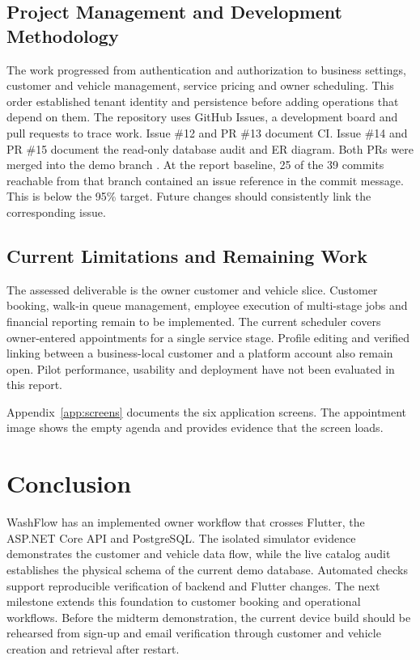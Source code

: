 \documentclass[12pt]{report}
\begin{document}
\section{Project Management and Development Methodology}
The work progressed from authentication and authorization to business settings, customer and vehicle management, service pricing and owner scheduling. This order established tenant identity and persistence before adding operations that depend on them. The repository uses GitHub Issues, a development board and pull requests to trace work. Issue \#12 and PR \#13 document CI. Issue \#14 and PR \#15 document the read-only database audit and ER diagram. Both PRs were merged into the demo branch \cite{ciPR,erdPR}. At the report baseline, 25 of the 39 commits reachable from that branch contained an issue reference in the commit message. This is below the 95\% target. Future changes should consistently link the corresponding issue.

\section{Current Limitations and Remaining Work}
The assessed deliverable is the owner customer and vehicle slice. Customer booking, walk-in queue management, employee execution of multi-stage jobs and financial reporting remain to be implemented. The current scheduler covers owner-entered appointments for a single service stage. Profile editing and verified linking between a business-local customer and a platform account also remain open. Pilot performance, usability and deployment have not been evaluated in this report.

Appendix~\ref{app:screens} documents the six application screens. The appointment image shows the empty agenda and provides evidence that the screen loads.

\chapter{Conclusion}
WashFlow has an implemented owner workflow that crosses Flutter, the ASP.NET Core API and PostgreSQL. The isolated simulator evidence demonstrates the customer and vehicle data flow, while the live catalog audit establishes the physical schema of the current demo database. Automated checks support reproducible verification of backend and Flutter changes. The next milestone extends this foundation to customer booking and operational workflows. Before the midterm demonstration, the current device build should be rehearsed from sign-up and email verification through customer and vehicle creation and retrieval after restart.
\end{document}
